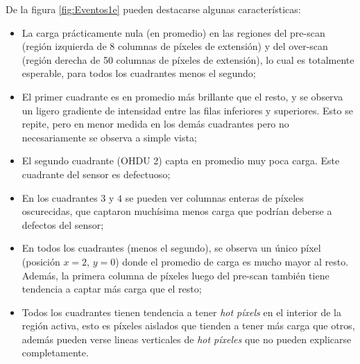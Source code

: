 \indent De la figura \ref{fig:Eventos1e} pueden destacarse algunas características:
\begin{itemize}
    \item La carga prácticamente nula (en promedio) en las regiones del pre-scan (región izquierda de $8$ columnas de píxeles de extensión) y del over-scan (región derecha de 50 columnas de píxeles de extensión), lo cual es totalmente esperable, para todos los cuadrantes menos el segundo;
    \item El primer cuadrante es en promedio más brillante que el resto, y se observa un ligero gradiente de intensidad entre las filas inferiores y superiores. Esto se repite, pero en menor medida en los demás cuadrantes pero no necesariamente se observa a simple vista;
    \item El segundo cuadrante (OHDU 2) capta en promedio muy poca carga. Este cuadrante del sensor es defectuoso;
    \item En los cuadrantes $3$ y $4$ se pueden ver columnas enteras de píxeles oscurecidas, que captaron muchísima menos carga que podrían deberse a defectos del sensor;
    \item En todos los cuadrantes (menos el segundo), se observa un único píxel (posición $x = 2$, $y = 0$) donde el promedio de carga es mucho mayor al resto. Además, la primera columna de píxeles luego del pre-scan también tiene tendencia a captar más carga que el resto;
    \item Todos los cuadrantes tienen tendencia a tener \textit{hot píxels} en el interior de la región activa, esto es píxeles aislados que tienden a tener más carga que otros, además pueden verse lineas verticales de \textit{hot píxeles} que no pueden explicarse completamente.
\end{itemize}
